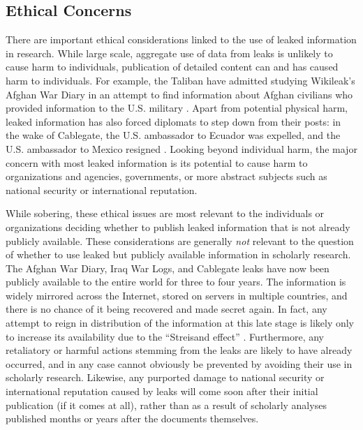 \documentclass[12pt]{article}
\begin{document}
\subsection{Ethical Concerns}

There are important ethical considerations linked to the use of leaked information in research. 
While large scale, aggregate use of data from leaks is unlikely to cause harm to individuals, 
publication of detailed content can and has 
caused harm to individuals. For example, the Taliban have admitted studying Wikileak's 
Afghan War Diary in an attempt to find information about Afghan civilians who provided information 
to the U.S. military \citep{winnett2010wikileaks}. Apart from potential physical harm, 
leaked information 
has also forced diplomats to step down from their posts: in the wake of Cablegate, the 
U.S. ambassador to Ecuador was expelled, and the U.S. ambassador to Mexico 
resigned \citep{romero2011ecuador,associated_press2011us}. 
Looking beyond individual harm, the major concern with most leaked information is its potential to 
cause harm to organizations and agencies, governments, or more abstract subjects such as 
national security or international reputation.

While sobering, these ethical issues are most relevant to the individuals or organizations deciding 
whether to publish leaked 
information that is not already publicly available. These considerations are generally \emph{not} 
relevant 
to the question of whether to use leaked but publicly available information in scholarly research. 
The Afghan War Diary, Iraq 
War Logs, and Cablegate leaks have now been publicly available to the entire world for three to four 
years. The information is widely mirrored across the Internet, stored on servers in multiple countries, 
and there is no chance of it being 
recovered and made secret again. In fact, any attempt to reign in distribution of the information at this 
late stage is likely only to increase its availability due to the ``Streisand effect'' \citep{marton2010protecting}. 
Furthermore, any retaliatory or harmful actions stemming from the leaks are likely 
to have already occurred, and in any case cannot obviously be prevented by avoiding their use in scholarly 
research. Likewise, any purported damage to national security or international reputation caused by leaks 
will come soon after their initial publication (if it comes at all), rather than as a result of scholarly analyses 
published months or years after the documents themselves.
\end{document}
